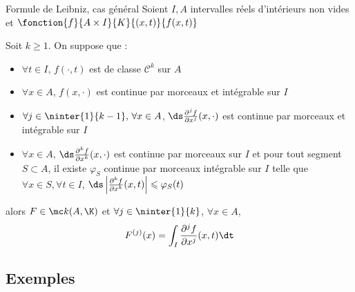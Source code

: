 \begin{theoreme}{Formule de Leibniz, cas général}{}
    Soient $I, A$ intervalles réels d'intérieurs non vides et $\fonction {f}{A \times I}{K}{(x, t)}{f(x, t)}$ 

    Soit $k \geqslant 1$. On suppose que : 
    \begin{itemize}
        \item $\forall t \in I$, $f(\cdot, t)$ est de classe $\mathscr C^k$ sur $A$
        \item $\forall x \in A$, $f(x, \cdot)$ est continue par morceaux et intégrable sur $I$
        \item $\forall j \in \ninter{1}{k - 1}, \, \forall x \in A$, $\ds \frac{\partial^j f}{\partial x^j}(x, \cdot)$ est continue 
        par morceaux et intégrable sur $I$
        \item $\forall x \in A$, $\ds \frac{\partial^k f }{\partial x^k}(x, \cdot)$ est continue par morceaux 
        sur $I$ et pour tout segment $S \subset A$, il existe $\varphi_S$ continue par morceaux intégrable sur 
        $I$ telle que $\forall x \in S, \forall t \in I$, $\ds \left| \frac{\partial^k f }{\partial x^k}(x, t) \right| \leqslant \varphi_S(t)$
    \end{itemize}

    \svspace alors $F \in \mc k (A, \K)$ et $\forall j \in \ninter{1}{k}$, $\forall x \in A$, 
    $$F^{(j)}(x) = \int_I \frac{\partial^j f}{\partial x^j}(x, t) \dt$$
\end{theoreme}

\subsection{Exemples }

